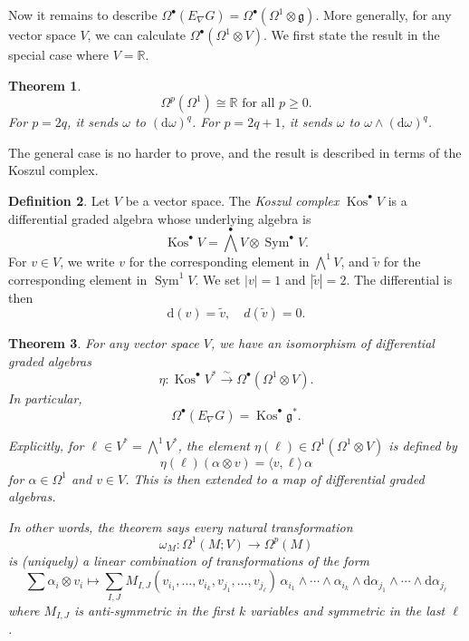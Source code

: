 \documentclass{shortart}
\newtheorem{thm}{Theorem}
\theoremstyle{definition}
\newtheorem{defi}[thm]{Definition}
\DeclareMathOperator\Sym{Sym}
\DeclareMathOperator\Kos{Kos}
\newcommand\R{\mathbb{R}}
\newcommand\exterior{{\textstyle \bigwedge}}
\renewcommand\d{\mathrm{d}}
\begin{document}
Now it remains to describe $\Omega^\bullet(E_\nabla G) = \Omega^\bullet(\Omega^1 \otimes \mathfrak{g})$. More generally, for any vector space $V$, we can calculate $\Omega^\bullet(\Omega^1 \otimes V)$. We first state the result in the special case where $V = \R$.

\begin{thm}
  \[
    \Omega^p(\Omega^1) \cong \R\text{ for all }p \geq 0.
  \]
  For $p = 2q$, it sends $\omega$ to $(\d\omega)^q$. For $p = 2q + 1$, it sends $\omega$ to $\omega \wedge (\d \omega)^q$.
\end{thm}

The general case is no harder to prove, and the result is described in terms of the Koszul complex.
\begin{defi}
  Let $V$ be a vector space. The \emph{Koszul complex} $\Kos^\bullet V$ is a differential graded algebra whose underlying algebra is
  \[
    \Kos^\bullet V = \exterior^\bullet V \otimes \Sym^\bullet V.
  \]
  For $v \in V$, we write $v$ for the corresponding element in $\exterior^1 V$, and $\tilde{v}$ for the corresponding element in $\Sym^1 V$. We set $|v| = 1$ and $|\tilde{v}| = 2$. The differential is then
  \[
    \d(v) = \tilde{v},\quad d(\tilde{v}) = 0.
  \]
\end{defi}

\begin{thm}\label{thm:main}
  For any vector space $V$, we have an isomorphism of differential graded algebras
  \[
    \eta: \Kos^\bullet V^* \overset{\sim}{\to} \Omega^\bullet (\Omega^1 \otimes V).
  \]
  In particular,
  \[
    \Omega^\bullet (E_\nabla G) = \Kos^\bullet \mathfrak{g}^*.
  \]

  Explicitly, for $\ell \in V^* = \exterior^1 V^*$, the element $\eta(\ell) \in \Omega^1(\Omega^1 \otimes V)$ is defined by
  \[
    \eta(\ell)(\alpha \otimes v) = \langle v, \ell\rangle\, \alpha
  \]
  for $\alpha \in \Omega^1$ and $v \in V$. This is then extended to a map of differential graded algebras.

  In other words, the theorem says every natural transformation
  \[
    \omega_M: \Omega^1(M; V) \to \Omega^p(M)
  \]
  is (uniquely) a linear combination of transformations of the form
  \[
    \sum \alpha_i \otimes v_i \mapsto \sum_{I, J} M_{I, J}(v_{i_1}, \ldots, v_{i_k}, v_{j_1}, \ldots, v_{j_\ell})\, \alpha_{i_1} \wedge \cdots \wedge \alpha_{i_k} \wedge \d \alpha_{j_1} \wedge \cdots \wedge \d \alpha_{j_\ell}
  \]
  where $M_{I, J}$ is anti-symmetric in the first $k$ variables and symmetric in the last $\ell$.
\end{thm}
\end{document}
